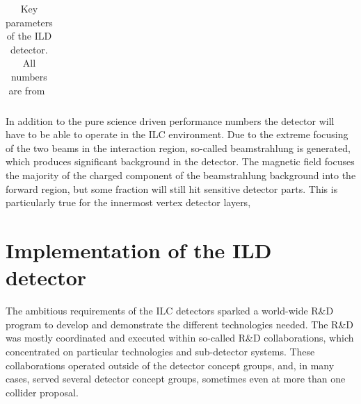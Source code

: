 \documentclass[%
 amsmath,amssymb,
 aps,
]{revtex4-1}
\newcommand{\bottomrule}{\hline}
\begin{document}
\begin{table}[th]
\begin{tabular}{|l|l|c|c|p{4cm}|}
        
\bottomrule
    \end{tabular}
    \caption{Key parameters of the ILD detector. All numbers are from~\cite{Behnke:2013lya}}
    \label{ild:tab:barrelpara}
\end{table}


In addition to the pure science driven performance numbers the detector will have to be able to operate in the ILC environment. Due to the extreme focusing of the two beams in the interaction region, so-called beamstrahlung is generated, which produces significant background in the detector. The magnetic field focuses the majority of the charged component of the beamstrahlung background into the forward region, but some fraction will still hit sensitive detector parts. This is particularly true for the innermost vertex detector layers, 


\section{Implementation of the ILD detector}
The ambitious requirements of the ILC detectors sparked a world-wide R\&D program to develop and demonstrate the different technologies needed. The R\&D was mostly coordinated and executed within so-called R\&D collaborations, which concentrated on particular technologies and sub-detector systems. These collaborations operated outside of the detector concept groups, and, in many cases, served several detector concept groups, sometimes even at more than one collider proposal. 
\end{document}
